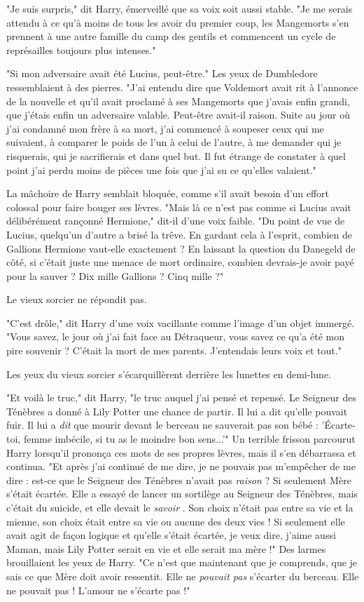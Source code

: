 "Je suis surpris," dit Harry, émerveillé que sa voix soit aussi stable. "Je me serais attendu à ce qu'à moins de tous les avoir du premier coup, les Mangemorts s'en prennent à une autre famille du camp des gentils et commencent un cycle de représailles toujours plus intenses."

"Si mon adversaire avait été Lucius, peut-être." Les yeux de Dumbledore ressemblaient à des pierres. "J'ai entendu dire que Voldemort avait rit à l'annonce de la nouvelle et qu'il avait proclamé à ses Mangemorts que j'avais enfin grandi, que j'étais enfin un adversaire valable. Peut-être avait-il raison. Suite au jour où j'ai condamné mon frère à sa mort, j'ai commencé à soupeser ceux qui me suivaient, à comparer le poids de l'un à celui de l'autre, à me demander qui je risquerais, qui je sacrifierais et dans quel but. Il fut étrange de constater à quel point j'ai perdu moins de pièces une fois que j'ai su ce qu'elles valaient."

La mâchoire de Harry semblait bloquée, comme s'il avait besoin d'un effort colossal pour faire bouger ses lèvres. "Mais là ce n'est pas comme si Lucius avait délibérément rançonné Hermione," dit-il d'une voix faible. "Du point de vue de Lucius, quelqu'un d'autre a brisé la trêve. En gardant cela à l'esprit, combien de Gallions Hermione vaut-elle exactement ? En laissant la question du Danegeld de côté, si c'était juste une menace de mort ordinaire, combien devrais-je avoir payé pour la sauver ? Dix mille Gallions ? Cinq mille ?"

Le vieux sorcier ne répondit pas.

"C'est drôle," dit Harry d'une voix vacillante comme l'image d'un objet immergé. "Vous savez, le jour où j'ai fait face au Détraqueur, vous savez ce qu'a été mon pire souvenir ? C'était la mort de mes parents. J'entendais leurs voix et tout."

Les yeux du vieux sorcier s'écarquillèrent derrière les lunettes en demi-lune.

"Et voilà le truc," dit Harry, "le truc auquel j'ai pensé et repensé. Le Seigneur des Ténèbres a donné à Lily Potter une chance de partir. Il lui a dit qu'elle pouvait fuir. Il lui a \emph{dit}  que mourir devant le berceau ne sauverait pas son bébé : 'Écarte-toi, femme imbécile, si tu as le moindre bon sens...'" Un terrible frisson parcourut Harry lorsqu'il prononça ces mots de ses propres lèvres, mais il s'en débarrassa et continua. "Et après j'ai continué de me dire, je ne pouvais pas m'empêcher de me dire : est-ce que le Seigneur des Ténèbres n'avait pas \emph{raison } ? Si seulement Mère s'était écartée. Elle a essayé de lancer un sortilège au Seigneur des Ténèbres, mais c'était du suicide, et elle devait le \emph{savoir} . Son choix n'était pas entre sa vie et la mienne, son choix était entre sa vie ou aucune des deux vies ! Si seulement elle avait agit de façon logique et qu'elle s'était écartée, je veux dire, j'aime aussi Maman, mais Lily Potter serait en vie et elle serait ma mère !" Des larmes brouillaient les yeux de Harry. "Ce n'est que maintenant que je comprends, que je sais ce que Mère doit avoir ressentit. Elle ne \emph{pouvait pas}  s'écarter du berceau. Elle ne pouvait pas ! L'amour ne s'écarte pas !"

